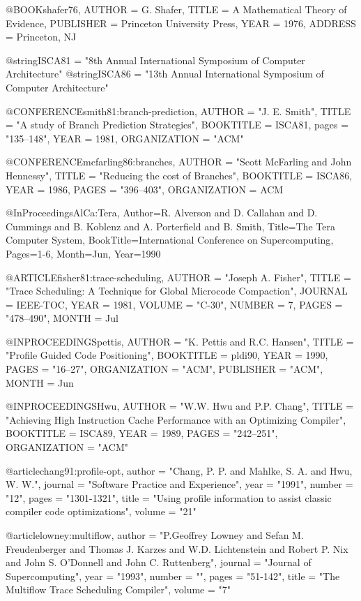 @BOOK{shafer76,
	AUTHOR = {G. Shafer},
	TITLE = {A Mathematical Theory of Evidence},
	PUBLISHER = {Princeton University Press},
	YEAR = {1976},
	ADDRESS = {Princeton, NJ}
}

@string{ISCA81 = "8th Annual International Symposium of Computer Architecture"}
@string{ISCA86 = "13th Annual International Symposium of Computer Architecture"}

@CONFERENCE{smith81:branch-prediction,
	AUTHOR = "J. E. Smith",
	TITLE = "A study of Branch Prediction Strategies",
	BOOKTITLE = ISCA81,
        pages = "135--148",
	YEAR = 1981,
	ORGANIZATION = "ACM"
}

@CONFERENCE{mcfarling86:branches,
	AUTHOR = "Scott McFarling and John Hennessy",
	TITLE = "Reducing the cost of Branches",
	BOOKTITLE = ISCA86,
	YEAR = 1986,
	PAGES = "396--403",
	ORGANIZATION = ACM
}

@InProceedings{AlCa:Tera,
        Author={R. Alverson and  D. Callahan and  D. Cummings and  B. Koblenz and 
                A. Porterfield and B. Smith}, 
        Title={The Tera Computer System},
        BookTitle={International Conference on Supercomputing},
        Pages={1-6},
        Month=Jun,
        Year={1990}
}

@ARTICLE{fisher81:trace-scheduling,
	AUTHOR = "Joseph A. Fisher",
	TITLE = "Trace Scheduling: A Technique for Global Microcode Compaction",
	JOURNAL = IEEE-TOC,
	YEAR = 1981,
	VOLUME = "C-30",
	NUMBER = 7,
	PAGES = "478--490",
	MONTH = Jul
}

@INPROCEEDINGS{pettis,
        AUTHOR = "K. Pettis and R.C. Hansen",
        TITLE = "Profile Guided Code Positioning",
        BOOKTITLE = pldi90,
        YEAR = 1990,
        PAGES = "16--27",
        ORGANIZATION = "ACM",
        PUBLISHER = "ACM",
        MONTH = Jun
}


@INPROCEEDINGS{Hwu,
	AUTHOR = "W.W. Hwu and P.P. Chang",
	TITLE = "Achieving High Instruction Cache Performance with an Optimizing Compiler",
	BOOKTITLE = ISCA89,
	YEAR = 1989,
	PAGES = "242--251",
	ORGANIZATION = "ACM"
}

@article{chang91:profile-opt,
	author =	"Chang, P. P. and Mahlke, S. A. and Hwu, W. W.",
	journal =	"Software Practice and Experience",
	year =		"1991",
	number =	"12",
	pages =		"1301-1321",
	title =		"Using profile information to assist classic compiler code optimizations",
	volume =	"21"
}

@article{lowney:multiflow,
	author =	"P.Geoffrey Lowney and Sefan M. Freudenberger and Thomas J. Karzes and W.D. Lichtenstein and Robert P. Nix and John S. O'Donnell and John C. Ruttenberg",
	journal =	"Journal of Supercomputing",
	year =		"1993",
	number =	"",
	pages =		"51-142",
	title =		"The Multiflow Trace Scheduling Compiler",
	volume =	"7"
}

